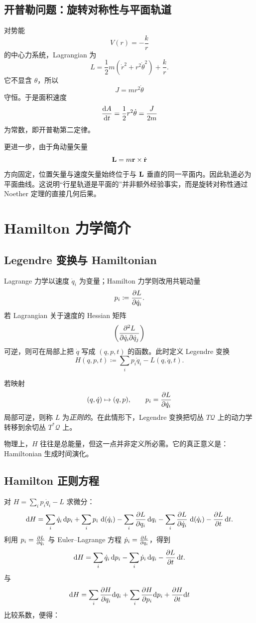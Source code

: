 \subsection{开普勒问题：旋转对称性与平面轨道}

\begin{example}[开普勒问题中的角动量守恒]
对势能
\[
  V(r)=-\frac{k}{r}
\]
的中心力系统，Lagrangian 为
\[
  L=\frac12 m(\dot r^2+r^2\dot\theta^2)+\frac{k}{r}.
\]
它不显含 $\theta$，所以
\[
  J=mr^2\dot\theta
\]
守恒。于是面积速度
\[
  \dv{A}{t}=\frac12 r^2\dot\theta = \frac{J}{2m}
\]
为常数，即开普勒第二定律。

更进一步，由于角动量矢量
\[
  \vb L = m\vb r\times \dot{\vb r}
\]
方向固定，位置矢量与速度矢量始终位于与 $\vb L$ 垂直的同一平面内。因此轨道必为平面曲线。这说明“行星轨道是平面的”并非额外经验事实，而是旋转对称性通过 Noether 定理的直接几何后果。
\end{example}

\section{Hamilton 力学简介}

\subsection{Legendre 变换与 Hamiltonian}

Lagrange 力学以速度 $\dot q_i$ 为变量；Hamilton 力学则改用共轭动量
\[
  p_i\coloneqq \pdv{L}{\dot q_i}.
\]
若 Lagrangian 关于速度的 Hessian 矩阵
\[
  \left(\pdv[2]{L}{\dot q_i}{\dot q_j}\right)
\]
可逆，则可在局部上把 $\dot q$ 写成 $(q,p,t)$ 的函数。此时定义 Legendre 变换
\[
  H(q,p,t)\coloneqq \sum_i p_i\dot q_i-L(q,\dot q,t).
\]

\begin{definition}[正则 Lagrangian]
若映射
\[
  (q,\dot q)\mapsto (q,p),\qquad p_i=\pdv{L}{\dot q_i}
\]
局部可逆，则称 $L$ 为\emph{正则的}。在此情形下，Legendre 变换把切丛 $T\mathcal Q$ 上的动力学转移到余切丛 $T^*\mathcal Q$ 上。
\end{definition}

物理上，$H$ 往往是总能量，但这一点并非定义所必需。它的真正意义是：Hamiltonian 生成时间演化。

\subsection{Hamilton 正则方程}

对 $H=\sum_i p_i\dot q_i-L$ 求微分：
\[
  \dd H = \sum_i \dot q_i\,\dd p_i + \sum_i p_i\,\dd(\dot q_i) - \sum_i \pdv{L}{q_i}\,\dd q_i - \sum_i \pdv{L}{\dot q_i}\,\dd(\dot q_i) - \pdv{L}{t}\,\dd t.
\]
利用 $p_i=\pdv{L}{\dot q_i}$ 与 Euler--Lagrange 方程 $\dot p_i=\pdv{L}{q_i}$，得到
\[
  \dd H = \sum_i \dot q_i\,\dd p_i - \sum_i \dot p_i\,\dd q_i - \pdv{L}{t}\,\dd t.
\]
与
\[
  \dd H = \sum_i \pdv{H}{q_i}\dd q_i + \sum_i \pdv{H}{p_i}\dd p_i + \pdv{H}{t}\dd t
\]
比较系数，便得：

